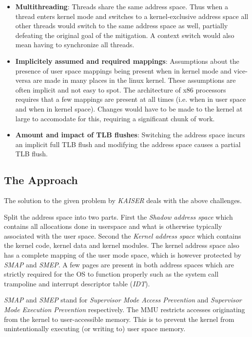 \begin{itemize}
  \item{
    \textbf{Multithreading}:
    Threads share the same address space.
    Thus when a thread enters kernel mode and switches to a kernel-exclusive address space all other threads would switch to the same address space as well, partially defeating the original goal of the mitigation.
    A context switch would also mean having to synchronize all threads.
  }
  \item{
    \textbf{Implicitely assumed and required mappings}:
    Assumptions about the presence of user space mappings being present when in kernel mode and vice-versa are made in many places in the linux kernel.
    These assumptions are often implicit and not easy to spot.
    The architecture of x86 processors requires that a few mappings are present at all times (i.e. when in user space and when in kernel space).
    Changes would have to be made to the kernel at large to accomodate for this, requiring a significant chunk of work.
  }
  \item{
    \textbf{Amount and impact of TLB flushes}:
    Switching the address space incurs an implicit full TLB flush and modifying the address space causes a partial TLB flush. \cite{the-ginormous-intel-manual-volume-3}
  }
\end{itemize}

\subsection{The Approach}

The solution to the given problem by \textit{KAISER} deals with the above challenges.

Split the address space into two parts. First the \textit{Shadow address space} which contains all allocations done in userspace and what is otherwise typically associated with the user space.
Second the \textit{Kernel address space} which contains the kernel code, kernel data and kernel modules.
The kernel address space also has a complete mapping of the user mode space, which is however protected by \textit{SMAP} and \textit{SMEP}.
A few pages are present in both address spaces which are strictly required for the OS to function properly such as the system call trampoline and interrupt descriptor table (\textit{IDT}).

\textit{SMAP} and \textit{SMEP} stand for \textit{Supervisor Mode Access Prevention} and \textit{Supervisor Mode Execution Prevention} respectively.
The MMU restricts accesses originating from the kernel to user-accessible memory.
This is to prevent the kernel from unintentionally executing (or writing to) user space memory.

